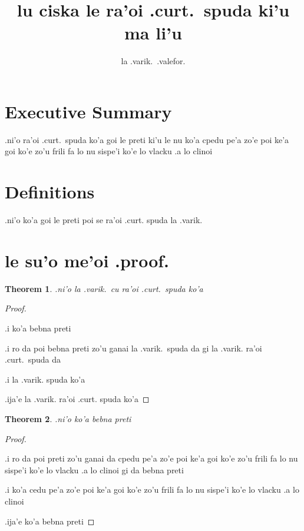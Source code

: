 \documentclass{article}
\title{lu ciska le ra'oi .curt.\ spuda ki'u ma li'u}
\author{la .varik.\ .valefor.}
\begin{document}
\newtheorem{thm}{Theorem}
\maketitle

\section{Executive Summary}
.ni'o ra'oi .curt.\ spuda ko'a goi le preti ki'u le nu ko'a cpedu pe'a zo'e poi ke'a goi ko'e zo'u frili fa lo nu sispe'i ko'e lo vlacku .a lo clinoi

\section{Definitions}
.ni'o ko'a goi le preti poi se ra'oi .curt. spuda la .varik.

\section{le su'o me'oi .proof.}
\begin{thm}
        .ni'o la .varik.\ cu ra'oi .curt.\ spuda ko'a
\end{thm}
\begin{proof}
        ${}$

        .i ko'a bebna preti

        .i ro da poi bebna preti zo'u ganai la .varik.\ spuda da gi la .varik. ra'oi .curt.\ spuda da

	.i la .varik. spuda ko'a

	.ija'e la .varik. ra'oi .curt. spuda ko'a
\end{proof}

\begin{thm}
        .ni'o ko'a bebna preti
\end{thm}
\begin{proof}
	${}$

	.i ro da poi preti zo'u ganai da cpedu pe'a zo'e poi ke'a goi ko'e zo'u frili fa lo nu sispe'i ko'e lo vlacku .a lo clinoi gi da bebna preti

	.i ko'a cedu pe'a zo'e poi ke'a goi ko'e zo'u frili fa lo nu sispe'i ko'e lo vlacku .a lo clinoi

	.ija'e ko'a bebna preti
\end{proof}
\end{document}
